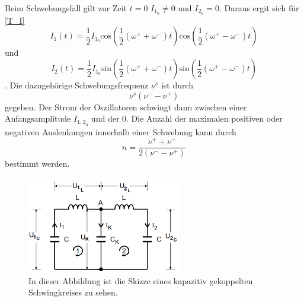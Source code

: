 Beim Schwebungsfall gilt zur Zeit $t = 0$ $I_{1_0}\neq 0$ und $I_{2_0} = 0$. Daraus ergit sich für \autoref{T_I} 
\begin{equation*}
    I_1(t) = \frac{1}{2} I_{1_0}\text{cos}\left(\frac{1}{2}(\omega^+ + \omega^-)t\right) \text{cos}\left(\frac{1}{2}(\omega^+ - \omega^-)t\right)
\end{equation*}
und
\begin{equation*}
    I_2(t) = \frac{1}{2} I_{1_0}\text{sin}\left(\frac{1}{2}(\omega^+ + \omega^-)t\right) \text{sin}\left(\frac{1}{2}(\omega^+ - \omega^-)t\right)
\end{equation*}
.
Die dazugehörige Schwebungsfrequenz $\nu^s$ ist durch 
\begin{equation}
    \label{T_Schwebung}
    \nu^s\left(\nu^- -\nu^+\right)
\end{equation}
gegeben. Der Strom der Oszillatoren schwingt dann zwischen einer Anfangsamplitude $I_{{1,2}_0}$ und der $0$.
Die Anzahl der maximalen positiven oder negativen Auslenkungen innerhalb einer Schwebung kann durch
\begin{equation}
    \label{T_n}
    n = \frac{\nu^+ + \nu^-}{2\left(\nu^- - \nu^+\right)} 
\end{equation}
bestimmt werden.  
\begin{figure}
    \centering
    \caption{In dieser Abbildung ist die Skizze eines kapazitiv gekoppelten Schwingkreises zu sehen. \cite{v355}}
    \label{fig:T_skgS}
    \includegraphics[width = 0.6\textwidth]{content/SkizzegekoppelterSchwingkreis.PNG}
\end{figure}

